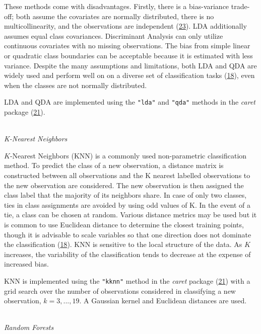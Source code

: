 \documentclass[12pt,]{article}
\begin{document}
These methods come with disadvantages. Firstly, there is a bias-variance
trade-off; both assume the covariates are normally distributed, there is
no multicollinearity, and the observations are independent
(\protect\hyperlink{ref-cover_geometrical_1965}{23}). LDA additionally
assumes equal class covariances. Discriminant Analysis can only utilize
continuous covariates with no missing observations. The bias from simple
linear or quadratic class boundaries can be acceptable because it is
estimated with less variance. Despite the many assumptions and
limitations, both LDA and QDA are widely used and perform well on on a
diverse set of classification tasks
(\protect\hyperlink{ref-hastie_elements_2009}{18}), even when the
classes are not normally distributed.

LDA and QDA are implemented using the \texttt{"lda"} and \texttt{"qda"}
methods in the \emph{caret} package
(\protect\hyperlink{ref-wing_caret:_2019}{21}).

\(~\)\\
\emph{K-Nearest Neighbors}

\(K\)-Nearest Neighbors (KNN) is a commonly used non-parametric
classification method. To predict the class of a new observation, a
distance matrix is constructed between all observations and the K
nearest labelled observations to the new observation are considered. The
new observation is then assigned the class label that the majority of
its neighbors share. In case of only two classes, ties in class
assignments are avoided by using odd values of K. In the event of a tie,
a class can be chosen at random. Various distance metrics may be used
but it is common to use Euclidean distance to determine the closest
training points, though it is advisable to scale variables so that one
direction does not dominate the classification
(\protect\hyperlink{ref-hastie_elements_2009}{18}). KNN is sensitive to
the local structure of the data. As \(K\) increases, the variability of
the classification tends to decrease at the expense of increased bias.

KNN is implemented using the \texttt{"kknn"} method in the \emph{caret}
package (\protect\hyperlink{ref-wing_caret:_2019}{21}) with a grid
search over the number of observations considered in classifying a new
observation, \(k=3,...,19\). A Gaussian kernel and Euclidean distances
are used.

\(~\)\\
\emph{Random Forests}
\end{document}
